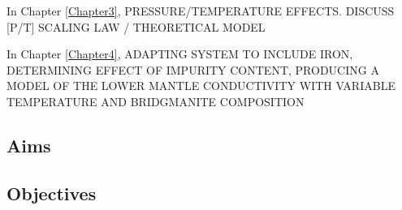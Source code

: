In Chapter \ref{Chapter3}, PRESSURE/TEMPERATURE EFFECTS. DISCUSS [P/T] SCALING LAW / THEORETICAL MODEL

In Chapter \ref{Chapter4}, ADAPTING SYSTEM TO INCLUDE IRON, DETERMINING EFFECT OF IMPURITY CONTENT, PRODUCING A MODEL OF THE LOWER MANTLE CONDUCTIVITY WITH VARIABLE TEMPERATURE AND BRIDGMANITE COMPOSITION

\subsection{Aims}

\subsection{Objectives}


